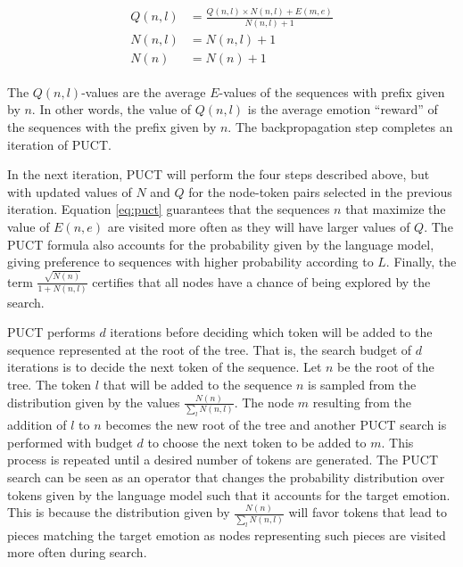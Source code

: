 \begin{enumerate}
   \begin{align}
   \label{eq:puct_backprop}
   \begin{split}
   Q(n, l) &= \frac{Q(n, l) \times N(n, l) + E(m, e)}{N(n, l) + 1} \\
   N(n, l) &= N(n, l) + 1 \\
   N(n) &= N(n) + 1
   \end{split}
   \end{align}

   The $Q(n, l)$-values are the average $E$-values of the sequences with prefix given by $n$. In other words, the value of $Q(n, l)$ is the average emotion ``reward'' of the sequences with the prefix given by $n$. The backpropagation step completes an iteration of PUCT.

\end{enumerate}

In the next iteration, PUCT will perform the four steps described above, but with updated values of $N$ and $Q$ for the node-token pairs selected in the previous iteration. Equation \ref{eq:puct} guarantees that the sequences $n$ that maximize the value of $E(n, e)$ are visited more often as they will have larger values of $Q$. The PUCT formula also accounts for the probability given by the language model, giving preference to sequences with higher probability according to $L$. Finally, the term $\frac{\sqrt{N(n)}}{1 + N(n, l)}$ certifies that all nodes have a chance of being explored by the search.

PUCT performs $d$ iterations before deciding which token will be added to the sequence represented at the root of the tree. That is, the search budget of $d$ iterations is to decide the next token of the sequence. Let $n$ be the root of the tree. The token $l$ that will be added to the sequence $n$ is sampled from the distribution given by the values $\frac{N(n)}{\sum_{l} N(n, l)}$. The node $m$ resulting from the addition of $l$ to $n$ becomes the new root of the tree and another PUCT search is performed with budget $d$ to choose the next token to be added to $m$. This process is repeated until a desired number of tokens are generated. The PUCT search can be seen as an operator that changes the probability distribution over tokens given by the language model such that it accounts for the target emotion. This is because the distribution given by $\frac{N(n)}{\sum_{l} N(n, l)}$ will favor tokens that lead to pieces matching the target emotion as nodes representing such pieces are visited more often during search.

